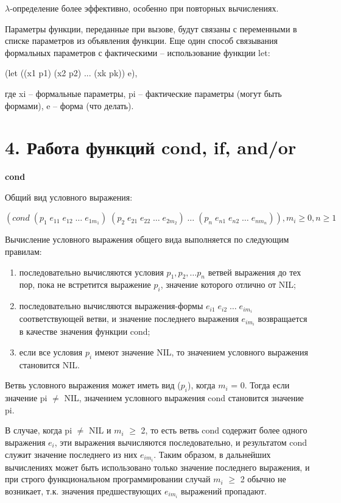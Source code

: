 \documentclass[12pt]{report}
\begin{document}
$\lambda$-определение более эффективно, особенно при повторных вычислениях. 

Параметры функции, переданные при вызове, будут связаны с переменными в списке параметров из объявления функции. Еще один способ связывания формальных параметров с фактическими -- использование функции let:

(let ((x1 p1) (x2 p2) ... (xk pk))  e),

где xi -- формальные параметры, pi -- фактические параметры (могут быть формами), e -- форма (что делать).

\section*{4. Работа функций cond, if, and/or}

\textbf{cond}

Общий вид условного выражения:

$(cond \; (p_1  \; e_{11}  \;  e_{12}  \;  …  \;  e_{1m_1})  \;  (p_2  \;  e_{21} \;  e_{22}  \;  …  \;  e_{2m_2})  \;  …  \;  (p_n  \; e_{n1} \;  e_{n2} \;  …  \; e_{nm_n})), m_i \geqslant 0 , n \geqslant 1$

Вычисление условного выражения общего вида выполняется по  следующим правилам:

\begin{enumerate}
	\item последовательно вычисляются условия $p_1, p_2, … p_n$ ветвей выражения до тех пор, пока не встретится выражение $p_i$, значение   которого отлично от NIL;
	\item последовательно вычисляются выражения-формы $e_{i1} \;  e_{i2} \;  … \;  e_{im_i}$ соответствующей ветви, и значение последнего выражения $e_{im_i}$ возвращается в качестве значения функции cond;
	\item если все условия $p_i$ имеют значение NIL, то значением условного выражения становится NIL.
\end{enumerate}

Ветвь условного выражения может иметь вид ($p_i$), когда $m_i$ = 0. Тогда если значение pi $\neq$ NIL, значением условного выражения cond становится значение pi.

В случае, когда pi $\neq$ NIL и $m_i$ $\geqslant$ 2, то есть ветвь cond содержит более  одного выражения $e_i$, эти выражения вычисляются последовательно, и  результатом cond служит значение последнего из них $e_{im_i}$. Таким  образом, в дальнейших вычислениях может быть использовано только значение последнего выражения, и при строго функциональном  программировании случай $m_i$ $\geqslant$ 2 обычно не возникает, т.к. значения  предшествующих $e_{im_i}$ выражений пропадают. 
\end{document}
